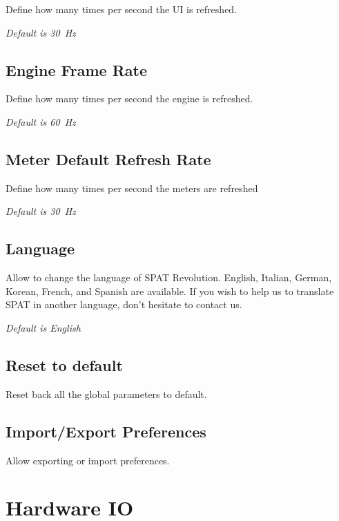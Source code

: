 \documentclass[
  letterpaper,
  DIV=11,
  numbers=noendperiod]{scrreport}
\begin{document}
Define how many times per second the UI is refreshed.

\emph{Default is 30~Hz}

\hypertarget{engine-frame-rate}{%
\subsection{Engine Frame Rate}\label{engine-frame-rate}}

Define how many times per second the engine is refreshed.

\emph{Default is 60~Hz}

\hypertarget{meter-default-refresh-rate}{%
\subsection{Meter Default Refresh
Rate}\label{meter-default-refresh-rate}}

Define how many times per second the meters are refreshed

\emph{Default is 30~Hz}

\hypertarget{language}{%
\subsection{Language}\label{language}}

Allow to change the language of SPAT Revolution. English, Italian,
German, Korean, French, and Spanish are available. If you wish to help
us to translate SPAT in another language, don't hesitate to contact us.

\emph{Default is English}

\hypertarget{reset-to-default}{%
\subsection{Reset to default}\label{reset-to-default}}

Reset back all the global parameters to default.

\hypertarget{importexport-preferences}{%
\subsection{Import/Export Preferences}\label{importexport-preferences}}

Allow exporting or import preferences.

\hypertarget{hardware-io}{%
\section{Hardware IO}\label{hardware-io}}
\end{document}
